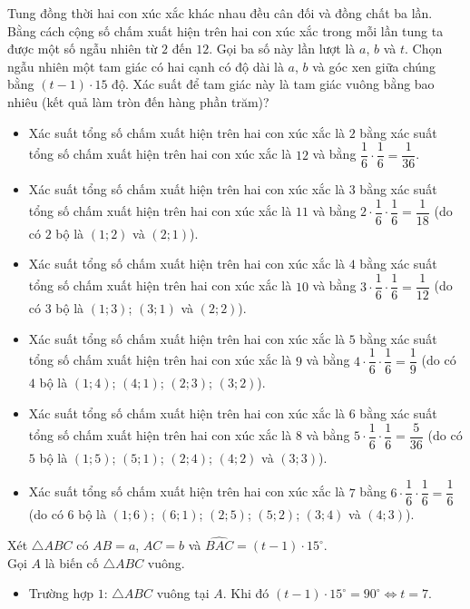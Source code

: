 \begin{ex}%
	Tung đồng thời hai con xúc xắc khác nhau đều cân đối và đồng chất ba lần. Bằng cách cộng số chấm xuất hiện trên hai con xúc xắc trong mỗi lần tung ta được một số ngẫu nhiên từ $2$ đến $12$. Gọi ba số này lần lượt là $a$, $b$ và $t$. Chọn ngẫu nhiên một tam giác có hai cạnh có độ dài là $a$, $b$ và góc xen giữa chúng bằng $(t-1) \cdot 15$ độ. Xác suất để tam giác này là tam giác vuông bằng bao nhiêu (kết quả làm tròn đến hàng phần trăm)?
	\par {}
	\loigiai
	{
		\begin{itemize}
			\item Xác suất tổng số chấm xuất hiện trên hai con xúc xắc là $2$ bằng xác suất tổng số chấm xuất hiện trên hai con xúc xắc là $12$ và bằng $\dfrac{1}{6}\cdot \dfrac{1}{6}=\dfrac{1}{36}$.
			\item Xác suất tổng số chấm xuất hiện trên hai con xúc xắc là $3$ bằng xác suất tổng số chấm xuất hiện trên hai con xúc xắc là $11$ và bằng $2\cdot\dfrac{1}{6}\cdot \dfrac{1}{6}=\dfrac{1}{18}$ (do có $2$ bộ là $(1;2)$ và $(2;1)$).
			\item Xác suất tổng số chấm xuất hiện trên hai con xúc xắc là $4$ bằng xác suất tổng số chấm xuất hiện trên hai con xúc xắc là $10$ và bằng $3\cdot\dfrac{1}{6}\cdot \dfrac{1}{6}=\dfrac{1}{12}$ (do có $3$ bộ là $(1;3)$; $(3;1)$ và $(2;2)$).
			\item Xác suất tổng số chấm xuất hiện trên hai con xúc xắc là $5$ bằng xác suất tổng số chấm xuất hiện trên hai con xúc xắc là $9$ và bằng $4\cdot\dfrac{1}{6}\cdot \dfrac{1}{6}=\dfrac{1}{9}$ (do có $4$ bộ là $(1;4)$; $(4;1)$; $(2;3)$; $(3;2)$).
			\item Xác suất tổng số chấm xuất hiện trên hai con xúc xắc là $6$ bằng xác suất tổng số chấm xuất hiện trên hai con xúc xắc là $8$ và bằng $5\cdot\dfrac{1}{6}\cdot \dfrac{1}{6}=\dfrac{5}{36}$ (do có $5$ bộ là $(1;5)$; $(5;1)$; $(2;4)$; $(4;2)$ và $(3;3)$).
			\item Xác suất tổng số chấm xuất hiện trên hai con xúc xắc là $7$ bằng $6\cdot\dfrac{1}{6}\cdot \dfrac{1}{6}=\dfrac{1}{6}$ (do có $6$ bộ là $(1;6)$; $(6;1)$; $(2;5)$; $(5;2)$; $(3;4)$ và $(4;3)$).
		\end{itemize}
		Xét $\triangle ABC$ có $AB=a$, $AC=b$ và $\widehat{BAC}=(t-1)\cdot 15^\circ$.\\
		Gọi $A$ là biến cố $\triangle ABC$ vuông.
		\begin{itemize}
			\item Trường hợp $1$: $\triangle ABC$ vuông tại $A$. Khi đó $(t-1)\cdot 15^\circ=90^\circ\Leftrightarrow t=7$. 

\end{itemize}}
\end{ex}

